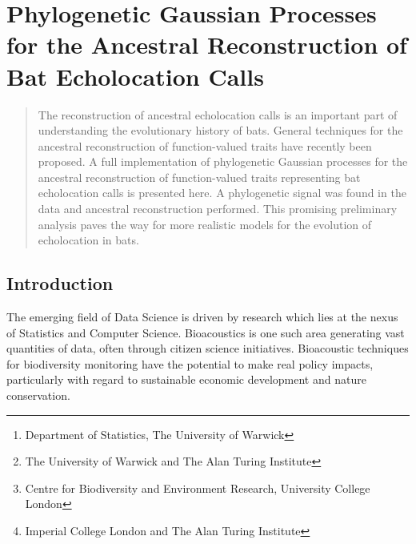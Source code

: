 \documentclass{ws-rv9x6}
\begin{document}
\chapter[Ancestral Reconstruction of Bat Echolocation Calls]{Phylogenetic Gaussian Processes for the Ancestral Reconstruction of Bat Echolocation Calls}\label{ra_ch1}

\author[J.P. Meagher et al.]{J.P. Meagher\footnote{Department of Statistics, The University of Warwick}, T. Damoulas\footnote{The University of Warwick and The Alan Turing Institute}, K.E. Jones\footnote{Centre for Biodiversity and Environment Research, University College London}, and M. Girolami\footnote{Imperial College London and The Alan Turing Institute}\\}

\address{
J.Meagher@Warwick.ac.uk}

\begin{abstract}
The reconstruction of ancestral echolocation calls is an important part of understanding the evolutionary history of bats. General techniques for the ancestral reconstruction of function-valued traits have recently been proposed. A full implementation of phylogenetic Gaussian processes for the ancestral reconstruction of function-valued traits representing bat echolocation calls is presented here. A phylogenetic signal was found in the data and ancestral reconstruction performed. This promising preliminary analysis paves the way for more realistic models for the evolution of echolocation in bats.
\end{abstract}
\body

\section{Introduction}
\label{sec:intro}
The emerging field of Data Science is driven by research which lies at the nexus of Statistics and Computer Science. Bioacoustics is one such area generating vast quantities of data, often through citizen science initiatives. \cite{allen2006citizen} \cite{pettorelli2013indicator} Bioacoustic techniques for biodiversity monitoring \cite{stathopoulos2017bat} \cite{damoulas2010bayesian} have the potential to make real policy impacts, particularly with regard to sustainable economic development and nature conservation.
\end{document}
